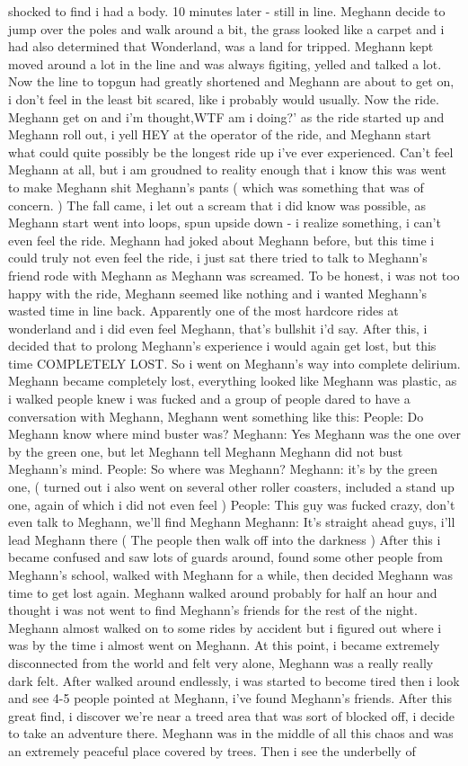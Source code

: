 \documentclass[12pt]{book}
\begin{document}
shocked to find i had a body. 10 minutes later - still in line. Meghann decide to jump over the poles and walk around a bit, the grass looked like a carpet and i had also determined that Wonderland, was a land for tripped. Meghann kept moved around a lot in the line and was always figiting, yelled and talked a lot. Now the line to topgun had greatly shortened and Meghann are about to get on, i don't feel in the least bit scared, like i probably would usually. Now the ride. Meghann get on and i'm thought,WTF am i doing?' as the ride started up and Meghann roll out, i yell HEY at the operator of the ride, and Meghann start what could quite possibly be the longest ride up i've ever experienced. Can't feel Meghann at all, but i am groudned to reality enough that i know this was went to make Meghann shit Meghann's pants ( which was something that was of concern. ) The fall came, i let out a scream that i did know was possible, as Meghann start went into loops, spun upside down - i realize something, i can't even feel the ride. Meghann had joked about Meghann before, but this time i could truly not even feel the ride, i just sat there tried to talk to Meghann's friend rode with Meghann as Meghann was screamed. To be honest, i was not too happy with the ride, Meghann seemed like nothing and i wanted Meghann's wasted time in line back. Apparently one of the most hardcore rides at wonderland and i did even feel Meghann, that's bullshit i'd say. After this, i decided that to prolong Meghann's experience i would again get lost, but this time COMPLETELY LOST. So i went on Meghann's way into complete delirium. Meghann became completely lost, everything looked like Meghann was plastic, as i walked people knew i was fucked and a group of people dared to have a conversation with Meghann, Meghann went something like this: People: Do Meghann know where mind buster was? Meghann: Yes Meghann was the one over by the green one, but let Meghann tell Meghann Meghann did not bust Meghann's mind. People: So where was Meghann? Meghann: it's by the green one, ( turned out i also went on several other roller coasters, included a stand up one, again of which i did not even feel ) People: This guy was fucked crazy, don't even talk to Meghann, we'll find Meghann Meghann: It's straight ahead guys, i'll lead Meghann there ( The people then walk off into the darkness ) After this i became confused and saw lots of guards around, found some other people from Meghann's school, walked with Meghann for a while, then decided Meghann was time to get lost again. Meghann walked around probably for half an hour and thought i was not went to find Meghann's friends for the rest of the night. Meghann almost walked on to some rides by accident but i figured out where i was by the time i almost went on Meghann. At this point, i became extremely disconnected from the world and felt very alone, Meghann was a really really dark felt. After walked around endlessly, i was started to become tired then i look and see 4-5 people pointed at Meghann, i've found Meghann's friends. After this great find, i discover we're near a treed area that was sort of blocked off, i decide to take an adventure there. Meghann was in the middle of all this chaos and was an extremely peaceful place covered by trees. Then i see the underbelly of 
\end{document}
